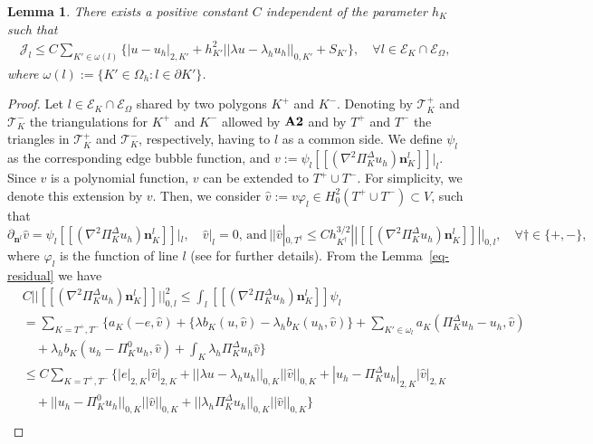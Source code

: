 \documentclass[final,reqno]{elsarticle}
\newtheorem{lemma}{Lemma}[section]
\def\O{\Omega}
\def\PiK{\Pi_{K}^{\Delta}}
\begin{document}
\begin{lemma}\label{jump_eff}
	There exists a positive constant $C$ independent of the parameter $h_K$ such that
	\begin{align}
	\mathcal{J}_l\leq C\sum\limits_{K'\in \omega(l)}\Big\{|u-u_h |_{2,K'}+ h_{K'}^2 ||\lambda u-\lambda_h u_h ||_{0,K'}+S_{K'}\Big\},\quad \forall l\in \mathcal{E}_K\cap\mathcal{E}_{\O}, 
	\end{align}
	where $\omega(l):=\Big\{K'\in \Omega_h:l\in \partial {K'} \}$.
\end{lemma}
\begin{proof}
Let $l\in \mathcal{E}_K\cap\mathcal{E}_{\Omega}$ shared by two polygons $K^+$ and $K^-$. Denoting by $\mathcal{T}_K^+$ and $\mathcal{T}_K^-$ the triangulations for $K^+$ and $K^-$ allowed by ${\bf A2}$ and by $T^+$ and $T^-$ the triangles in $\mathcal{T}_K^+$ and $\mathcal{T}_K^-$, respectively, having to $l$ as a common side. We define $\psi_l$ as the corresponding edge bubble function, and $v:=\psi_l[\![(\nabla^2\PiK u_h )\boldsymbol{n}_K^{l}]\!]|_l$. Since $v$ is a polynomial function, $v$ can be extended to $T^+\cup T^-$. For simplicity, we denote this extension by $v$. Then, we consider $\hat{v}:=v\varphi_l\in H_0^2(T^+\cup T^-)\subset V$, such that 
$$
\partial_{\boldsymbol{n}^l}\hat{v}=\psi_l[\![(\nabla^2\PiK u_h )\boldsymbol{n}_K^{l}]\!]|_l,\quad  \hat{v}|_l=0,
\, \mbox{and}\,
||\hat{v}|_{0,T^\dagger}\leq Ch_{K^\dagger}^{3/2}|| [\![(\nabla^2\PiK u_h )\boldsymbol{n}_K^{l}]\!]||_{0,l},
\quad  \forall \dagger  \in \{+,- \},
$$
where $\varphi_l$ is the function of line $l$ (see \cite[Section~5.3]{chen2022posteriori} for further details). From the Lemma~\ref{eq-residual} we have
\begin{align*}
&C ||[\![(\nabla^2\PiK u_h )\boldsymbol{n}_K^{l}]\!]||_{0,l}^2 \leq \int_l [\![(\nabla^2\PiK u_h )\boldsymbol{n}_K^{l}]\!]\psi_l\nonumber\\
&=\sum\limits_{K=T^+,T^-}\Bigg\{ a_K(-e,\hat{v})+ \Big\{\lambda b_K(u,\hat{v})-\lambda_h b_K(u_h,\hat{v}) \Big \} + \sum\limits_{K'\in \omega_l}a_K(\PiK u_h-u_h,\hat{v}) \nonumber\\ 
&\quad + \lambda_h    b_K(u_h-\Pi_K^0 u_h,\hat{v})
 +\int_K \lambda_h \PiK u_h \hat{v} \Bigg\} \nonumber\\
&\leq C \sum\limits_{K=T^+,T^-}\Bigg\{ |e|_{2,K}|\hat{v}|_{2,K}+ ||\lambda u -\lambda_h u_h ||_{0,K}||\hat{v} ||_{0,K} + |u_h-\PiK u_h|_{2,K}|\hat{v}|_{2,K}\nonumber \\
&\quad +||u_h-\Pi_K^0 u_h ||_{0,K}|| \hat{v}||_{0,K}
+ ||\lambda_h \PiK u_h ||_{0,K}|| \hat{v}||_{0,K}\Bigg\}\nonumber\\

\end{align*}
\end{proof}
\end{document}
